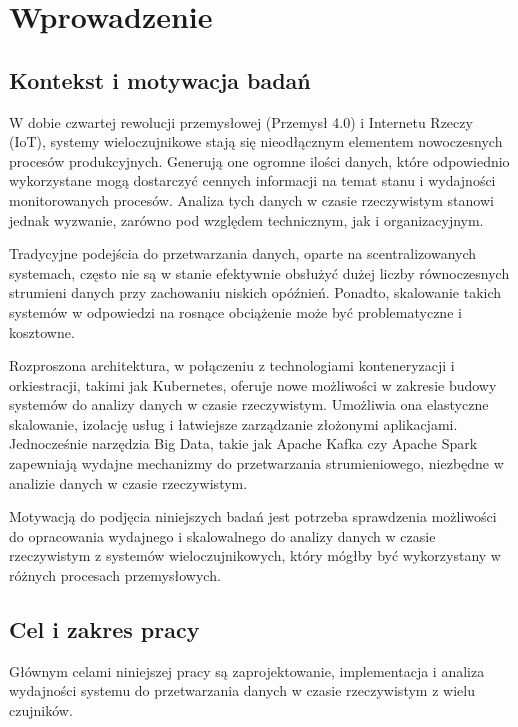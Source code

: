 \section{Wprowadzenie}
\label{sec:wprowadzenie}

\subsection{Kontekst i motywacja badań}
\label{subsec:kontekst}

W dobie czwartej rewolucji przemysłowej (Przemysł 4.0) i Internetu Rzeczy (IoT), systemy wieloczujnikowe stają się nieodłącznym
elementem nowoczesnych procesów produkcyjnych. Generują one ogromne ilości danych, które odpowiednio wykorzystane mogą dostarczyć
cennych informacji na temat stanu i wydajności monitorowanych procesów. Analiza tych danych w czasie rzeczywistym stanowi jednak
wyzwanie, zarówno pod względem technicznym, jak i organizacyjnym.

Tradycyjne podejścia do przetwarzania danych, oparte na scentralizowanych systemach, często nie są w stanie efektywnie obsłużyć
dużej liczby równoczesnych strumieni danych przy zachowaniu niskich opóźnień. Ponadto, skalowanie takich systemów w odpowiedzi na rosnące
obciążenie może być problematyczne i kosztowne.

Rozproszona architektura, w połączeniu z technologiami konteneryzacji i orkiestracji, takimi jak Kubernetes,
oferuje nowe możliwości w zakresie budowy systemów do analizy danych w czasie rzeczywistym. Umożliwia ona elastyczne skalowanie,
izolację usług i łatwiejsze zarządzanie złożonymi aplikacjami. Jednocześnie narzędzia Big Data, takie jak Apache Kafka czy Apache Spark zapewniają
wydajne mechanizmy do przetwarzania strumieniowego, niezbędne w analizie danych w czasie rzeczywistym.

Motywacją do podjęcia niniejszych badań jest potrzeba sprawdzenia możliwości do opracowania wydajnego i skalowalnego do
analizy danych w czasie rzeczywistym z systemów wieloczujnikowych, który mógłby być wykorzystany w różnych procesach przemysłowych.

\subsection{Cel i zakres pracy}
\label{subsec:cel}

Głównym celami niniejszej pracy są zaprojektowanie, implementacja i analiza wydajności systemu do przetwarzania danych w
czasie rzeczywistym z wielu czujników.

